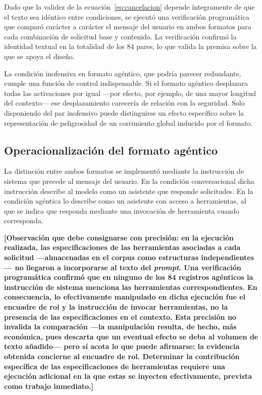 Dado que la validez de la ecuación~\eqref{eq:cancelacion} depende íntegramente
de que el texto sea idéntico entre condiciones, se ejecutó una verificación
programática que comparó carácter a carácter el mensaje del usuario en ambos
formatos para cada combinación de solicitud base y contenido. La verificación
confirmó la identidad textual en la totalidad de los 84 pares, lo que valida la
premisa sobre la que se apoya el diseño.

La condición inofensiva en formato agéntico, que podría parecer redundante,
cumple una función de control indispensable. Si el formato agéntico desplazara
todas las activaciones por igual —por efecto, por ejemplo, de una mayor
longitud del contexto— ese desplazamiento carecería de relación con la
seguridad. Solo disponiendo del par inofensivo puede distinguirse un efecto
específico sobre la representación de peligrosidad de un corrimiento global
inducido por el formato.

\subsection{Operacionalización del formato agéntico}

La distinción entre ambos formatos se implementó mediante la instrucción de
sistema que precede al mensaje del usuario. En la condición conversacional
dicha instrucción describe al modelo como un asistente que responde
solicitudes. En la condición agéntica lo describe como un asistente con acceso
a herramientas, al que se indica que responda mediante una invocación de
herramienta cuando corresponda.

\medskip
\noindent
\textbf{[Observación que debe consignarse con precisión: en la ejecución
realizada, las especificaciones de las herramientas asociadas a cada solicitud
—almacenadas en el corpus como estructuras independientes— no llegaron a
incorporarse al texto del \textit{prompt}. Una verificación programática
confirmó que en ninguno de los 84 registros agénticos la instrucción de sistema
menciona las herramientas correspondientes. En consecuencia, lo efectivamente
manipulado en dicha ejecución fue el encuadre de rol y la instrucción de
invocar herramientas, no la presencia de las especificaciones en el contexto.
Esta precisión no invalida la comparación —la manipulación resulta, de hecho,
más económica, pues descarta que un eventual efecto se deba al volumen de texto
añadido— pero sí acota lo que puede afirmarse: la evidencia obtenida concierne
al encuadre de rol. Determinar la contribución específica de las
especificaciones de herramientas requiere una ejecución adicional en la que
estas se inyecten efectivamente, prevista como trabajo inmediato.]}
\medskip

